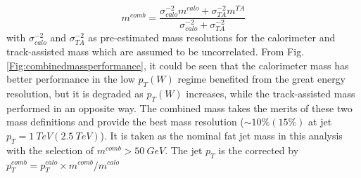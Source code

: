 \begin{equation}
m^{comb} = \frac{\sigma_{{calo}}^{-2} m^{{calo}} + \sigma_{{TA}}^{-2} m^{{TA}} }{\sigma_{{calo}}^{-2} + \sigma_{{TA}}^{-2}}
\end{equation}
with $\sigma_{{calo}}^{-2}$ and $\sigma_{{TA}}^{-2}$ as pre-estimated mass resolutions for  the calorimeter and track-assisted mass which are assumed to be uncorrelated. From Fig. \ref{Fig:combinedmassperformance}, it could be seen that the calorimeter mass has better performance in the low $p_{T}(W)$ regime benefited from the great energy resolution, but it is degraded as $p_{T}(W)$ increases, while the track-assisted mass performed in an opposite way. The combined mass takes the merits of these two mass definitions and provide the best mass resolution ($\sim10\% (15\%)$ at jet $p_{T}=1~TeV(2.5~TeV)$). It is taken as the nominal fat jet mass in this analysis with the selection of $m^{comb}>50~GeV$. The jet $p_{T}$ is the corrected by $p_{T}^{comb}=p_{T}^{calo}\times m^{comb}/m^{calo}$ 

